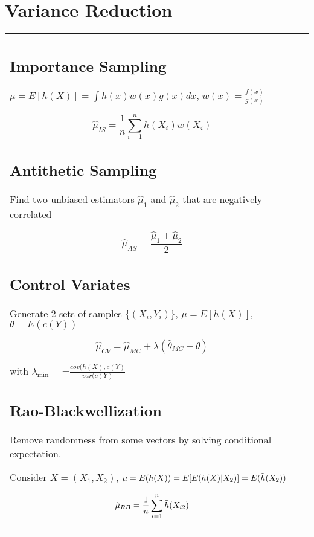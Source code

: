 \section{Variance Reduction}

\begin{tabulary}{\textwidth}{l L}

\subsection{Importance Sampling}

$\mu = E[h(X)] = \int h(x) w(x) g(x) dx$, $w(x) = \frac{f(x)}{g(x)}$

$$
\hat\mu_{IS} = \frac{1}{n} \sum_{i=1}^n h(X_i) w(X_i)
$$

\subsection{Antithetic Sampling}

Find two unbiased estimators $\hat\mu_1$ and $\hat\mu_2$ that are negatively correlated

$$
\hat\mu_{AS} = \frac{\hat\mu_1 + \hat\mu_2}{2}
$$

\subsection{Control Variates}

Generate 2 sets of samples $\{(X_i, Y_i)\}$, $\mu = E[h(X)]$, $\theta = E(c(Y))$

$$
\hat\mu_{CV} = \hat\mu_{MC} + \lambda (\hat\theta_{MC} - \theta)
$$

with $\lambda_{\min} = - \frac{cov(h(X), c(Y)}{var(c(Y)}$

\subsection{Rao-Blackwellization}

Remove randomness from some vectors by solving conditional expectation.

Consider $X = (X_1, X_2)$, $\mu = E(h(X)) = E[E(h(X)|X_2)] = E(\Tilde{h}(X_2))$

$$\hat\mu_{RB} = \frac{1}{n} \sum_{i=1}^n \Tilde{h}(X_{i2})$$

\end{tabulary}